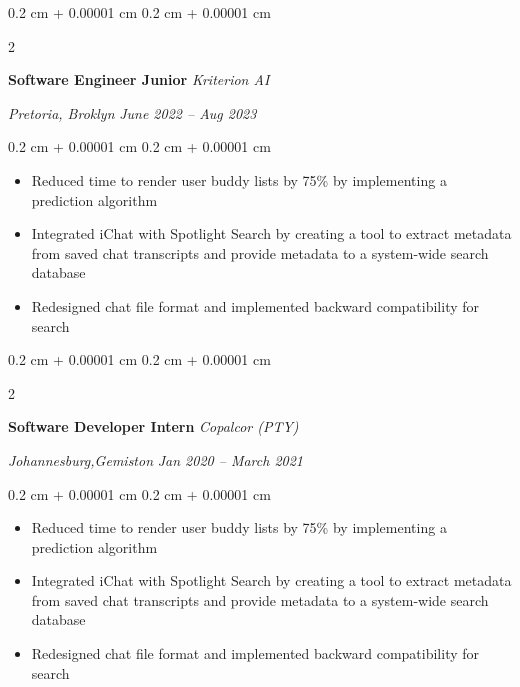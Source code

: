 \documentclass[10pt, letterpaper]{article}
\newenvironment{highlights}{
    \begin{itemize}[
        topsep=0.10 cm,
        parsep=0.10 cm,
        partopsep=0pt,
        itemsep=0pt,
        leftmargin=0.4 cm + 10pt
    ]
}{
    \end{itemize}
} %
\newenvironment{onecolentry}{
    \begin{adjustwidth}{
        0.2 cm + 0.00001 cm
    }{
        0.2 cm + 0.00001 cm
    }
}{
    \end{adjustwidth}
} %
\newenvironment{twocolentry}[2][]{
    \onecolentry
    \def\secondColumn{#2}
    \setcolumnwidth{\fill, 4.5 cm}
    \begin{paracol}{2}
}{
    \switchcolumn \raggedleft \secondColumn
    \end{paracol}
    \endonecolentry
} %
\begin{document}
        \vspace{0.2 cm}

        \begin{twocolentry}{
        \textit{Pretoria, Broklyn}
        \newline
        \textit{June 2022 – Aug 2023}}
            \textbf{Software Engineer Junior}
            \newline
            \textit{Kriterion AI}
        \end{twocolentry}

        \vspace{0.20 cm}
        \begin{onecolentry}
            \begin{highlights}
                \item Reduced time to render user buddy lists by 75\% by implementing a prediction algorithm
                \item Integrated iChat with Spotlight Search by creating a tool to extract metadata from saved chat transcripts and provide metadata to a system-wide search database
                \item Redesigned chat file format and implemented backward compatibility for search
            \end{highlights}
        \end{onecolentry}

        \vspace{0.2 cm}

        \begin{twocolentry}{
        \textit{Johannesburg,Gemiston}
        \newline
        \textit{Jan 2020 – March 2021}}
            \textbf{Software Developer Intern}
            \newline
            \textit{Copalcor (PTY)}
        \end{twocolentry}

        \vspace{0.20 cm}
        \begin{onecolentry}
            \begin{highlights}
                \item Reduced time to render user buddy lists by 75\% by implementing a prediction algorithm
                \item Integrated iChat with Spotlight Search by creating a tool to extract metadata from saved chat transcripts and provide metadata to a system-wide search database
                \item Redesigned chat file format and implemented backward compatibility for search
            \end{highlights}
        \end{onecolentry}
\end{document}
